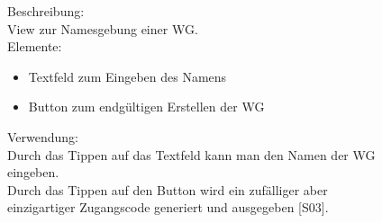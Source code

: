 \documentclass[a4paper]{scrreprt}
\begin{document}
\begin{figure}[h!]
\begin{minipage}[t]{0.55\linewidth}
    			Beschreibung: \\
    			View zur Namesgebung einer WG.
    			\\
    			Elemente:
    			\begin{itemize}
    				\renewcommand\labelitemi{--}
    				\item Textfeld zum Eingeben des Namens
    				\item Button zum endgültigen Erstellen der WG
    				
    			\end{itemize}
    			
    			Verwendung:\\
    			Durch das Tippen auf das Textfeld kann man
    			den Namen der WG eingeben. \\
    			Durch das Tippen auf den Button wird ein 
    			zufälliger aber einzigartiger Zugangscode 
    			generiert und ausgegeben {[}S03{]}.
    			
    			
    			
    		\end{minipage}
    	\end{figure}
    
    	\clearpage
    	
\end{document}
